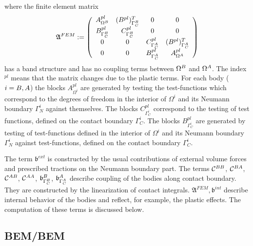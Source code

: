 \documentclass[12pt,a4paper]{scrbook}
\begin{document}
where the finite element matrix
\begin{equation*}
\mathfrak{A}^{FEM} :=
   \left (
   \begin{array}{cccc}
   A^{pl}_{\Omega^{\sl}}    & (B^{pl})^{T}_{\Gamma^{\sl}_C} & 0                & 0\\
   B^{pl}_{\Gamma^{\sl}_C}  & C^{pl}_{\Gamma^{\sl}_C}     & 0                & 0 \\
   0               & 0                  & C^{pl}_{\Gamma^{\ms}_C}   & (B^{pl})^T_{\Gamma^{\ms}_C} \\
   0               & 0                  & B^{pl}_{\Gamma^{\ms}_C}   & A^{pl}_{\Omega^{\ms}}
   \end{array}
   \right )
\end{equation*}
has a band structure and has no coupling terms between $\Omega^{\sl}$ and $\Omega^{\ms}$. The index $^{pl}$ means that the matrix changes due to the plastic terms. For each body ($i=\sl,\ms$) the blocks $A^{pl}_{\Omega^i}$ are generated by testing the test-functions which correspond to the degrees of freedom in the interior of $\Omega^i$ and its Neumann boundary $\Gamma^i_N$ against themselves. The blocks $C^{pl}_{\Gamma^i_C}$ correspond to the testing of test functions, defined on the contact boundary $\Gamma^i_C$. The blocks $B^{pl}_{\Gamma^i_C}$ are generated by testing of test-functions defined in the interior of $\Omega^i$ and its Neumann boundary $\Gamma^i_N$ against test-functions, defined on the contact boundary $\Gamma^i_C$.

The term ${\mathfrak b}^{ext}$ is constructed by the usual contributions of external volume forces and prescribed tractions on the Neumann boundary part. The terms $\mathcal{C}^{\sl\sl}$, $\mathcal{C}^{\sl \ms}$, $\mathcal{C}^{\ms \sl}$, $\mathcal{C}^{\ms \ms}$, ${\mathfrak b}^{\sl}_{\Gamma_C^{\sl}}$,   ${\mathfrak b}^{\ms}_{\Gamma_C^{\ms}}$ describe coupling of the bodies along contact boundary. They are constructed by the linearization of contact integrals. $\mathfrak{A}^{FEM}, {\mathfrak b}^{int}$ describe internal behavior of the bodies and reflect, for example, the plastic effects. The computation of these terms is discussed below. 


\subsection{BEM/BEM}\label{sec:BEMBEM}
\end{document}
